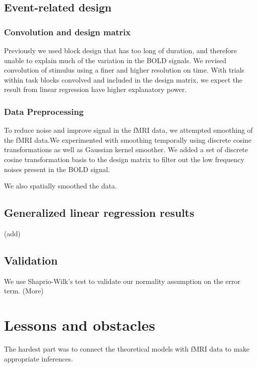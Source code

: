 \documentclass[11pt]{article} \usepackage{graphicx} \graphicspath{ {images/} }
\begin{document}
\subsection{Event-related design} 
\subsubsection{Convolution and design matrix}
Previously we used block design that has too long of duration, and therefore
unable to explain much of the variation in the BOLD signals. We revised
convolution of stimulus using a finer and higher resolution on time. With trials
within task blocks convolved and included in the design matrix, we expect the
result from linear regression have higher explanatory power. 

\subsubsection{Data Preprocessing} 
To reduce noise and improve signal in the fMRI data, we attempted smoothing of
the fMRI data.We experimented with smoothing temporally using discrete cosine
transformations as well as Gaussian kernel smoother. We added a set of discrete
cosine transformation basis to the design matrix to filter out the low frequency
noises present in the BOLD signal.

We also spatially smoothed the data. 

\subsection{Generalized linear regression results}
(add)



\subsection{Validation}
We use Shaprio-Wilk's test to validate our normality assumption on the error
term. (More)

\section{Lessons and obstacles}

The hardest part was to connect the theoretical models with fMRI data to make
appropriate inferences. 


\end{document}
